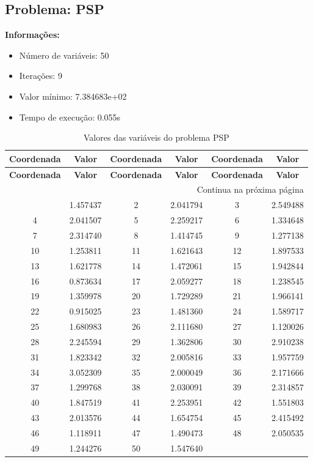 \documentclass[12pt]{article}
\begin{document}
\newpage            
\subsection{Problema: PSP}

\textbf{Informações:}
\begin{itemize}
\item Número de variáveis: 50
\item Iterações: 9
\item Valor mínimo: 7.384683e+02
\item Tempo de execução: 0.055s
\end{itemize}

\small
\begin{longtable}{@{}cc|cc|cc@{}}
\caption{Valores das variáveis do problema PSP} \\
\toprule
\textbf{Coordenada} & \textbf{Valor} & \textbf{Coordenada} & \textbf{Valor} & \textbf{Coordenada} & \textbf{Valor} \\
\midrule
\endfirsthead

\toprule
\textbf{Coordenada} & \textbf{Valor} & \textbf{Coordenada} & \textbf{Valor} & \textbf{Coordenada} & \textbf{Valor} \\
\midrule
\endhead

\midrule \multicolumn{6}{r}{{Continua na próxima página}} \\ \midrule
\endfoot

\bottomrule
\endlastfoot
1 & 1.457437 & 2 & 2.041794 & 3 & 2.549488 \\
4 & 2.041507 & 5 & 2.259217 & 6 & 1.334648 \\
7 & 2.314740 & 8 & 1.414745 & 9 & 1.277138 \\
10 & 1.253811 & 11 & 1.621643 & 12 & 1.897533 \\
13 & 1.621778 & 14 & 1.472061 & 15 & 1.942844 \\
16 & 0.873634 & 17 & 2.059277 & 18 & 1.238545 \\
19 & 1.359978 & 20 & 1.729289 & 21 & 1.966141 \\
22 & 0.915025 & 23 & 1.481360 & 24 & 1.589717 \\
25 & 1.680983 & 26 & 2.111680 & 27 & 1.120026 \\
28 & 2.245594 & 29 & 1.362806 & 30 & 2.910238 \\
31 & 1.823342 & 32 & 2.005816 & 33 & 1.957759 \\
34 & 3.052309 & 35 & 2.000049 & 36 & 2.171666 \\
37 & 1.299768 & 38 & 2.030091 & 39 & 2.314857 \\
40 & 1.847519 & 41 & 2.253951 & 42 & 1.551803 \\
43 & 2.013576 & 44 & 1.654754 & 45 & 2.415492 \\
46 & 1.118911 & 47 & 1.490473 & 48 & 2.050535 \\
49 & 1.244276 & 50 & 1.547640 &  &  \\

\end{longtable}
\end{document}

